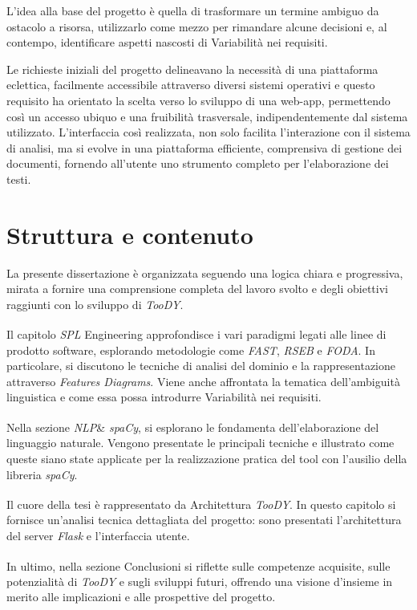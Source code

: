 \documentclass[12pt]{report}
\newcommand{\myref}[1]{\textsuperscript{\hyperref[#1]{\ding{70}}}}
\newcommand{\toody}{\textsl{TooDY}\xspace}
\newcommand{\flask}{\textsl{Flask}\xspace}
\newcommand{\spacy}{\textsl{spaCy}\xspace}
\newcommand{\spl}{\textsl{SPL}\xspace}
\newcommand{\nlp}{\textsl{NLP}\xspace}
\begin{document}
L’idea alla base del progetto è quella di trasformare un termine ambiguo da ostacolo a risorsa, utilizzarlo come mezzo per rimandare alcune decisioni e, al contempo, identificare aspetti nascosti di Variabilità nei requisiti.

Le richieste iniziali del progetto delineavano la necessità di una piattaforma eclettica, facilmente accessibile attraverso diversi sistemi operativi e questo requisito ha orientato la scelta verso lo sviluppo di una web-app, permettendo così un accesso ubiquo e una fruibilità trasversale, indipendentemente dal sistema utilizzato. L'interfaccia così realizzata, non solo facilita l'interazione con il sistema di analisi, ma si evolve in una piattaforma efficiente, comprensiva di gestione dei documenti, fornendo all'utente uno strumento completo per l'elaborazione dei testi.


\section{Struttura e contenuto}
La presente dissertazione è organizzata seguendo una logica chiara e progressiva, mirata a fornire una comprensione completa del lavoro svolto e degli obiettivi raggiunti con lo sviluppo di \toody.


\begin{mdframed}
\small
Il capitolo \textsf{\spl Engineering}\myref{sec:sple} approfondisce i vari paradigmi legati alle linee di prodotto software, esplorando metodologie come \textit{FAST}, \textit{RSEB} e \textit{FODA}. In particolare, si discutono le tecniche di analisi del dominio e la rappresentazione attraverso \textit{Features Diagrams}. Viene anche affrontata la tematica dell’ambiguità linguistica e come essa possa introdurre Variabilità nei requisiti.

\vspace{0.25cm}

Nella sezione \textsf{\nlp \& \spacy}\myref{sec:nlp}, si esplorano le fondamenta dell'elaborazione del linguaggio naturale. Vengono presentate le principali tecniche e illustrato come queste siano state applicate per la realizzazione pratica del tool con l'ausilio della libreria \spacy.

\vspace{0.25cm}

Il cuore della tesi è rappresentato da \textsf{Architettura \toody}\myref{sec:architettura}. In questo capitolo si fornisce un'analisi tecnica dettagliata del progetto: sono presentati l'architettura del server \flask e l’interfaccia utente.

\vspace{0.25cm}

In ultimo, nella sezione \textsf{Conclusioni}\myref{sec:conclusioni} si riflette sulle competenze acquisite, sulle potenzialità di \toody e sugli sviluppi futuri, offrendo una visione d'insieme in merito alle implicazioni e alle prospettive del progetto.
\end{mdframed}
\end{document}
